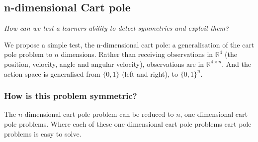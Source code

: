 %
%
%
%
%
%

\subsection{n-dimensional Cart pole}\label{action-space-experiments}

\begin{displayquote}
  \textit{How can we test a learners ability to detect symmetries and exploit them?}
\end{displayquote}

We propose a simple test, the n-dimensional cart pole: a generalisation of the
cart pole problem to $n$ dimensions. Rather than receiving observations in
$\mathbb{R}^4$ (the position, velocity, angle and angular velocity), observations are
in $\mathbb{R}^{4\times n}$. And the action space is generalised from $\{0,1\}$ (left and right),
to $\{0,1\}^{n}$.


\subsubsection{How is this problem symmetric?}

The $n$-dimensional cart pole problem can be reduced to $n$, one dimensional cart pole problems.
Where each of these one dimensional cart pole problems cart pole problems is easy to solve.

